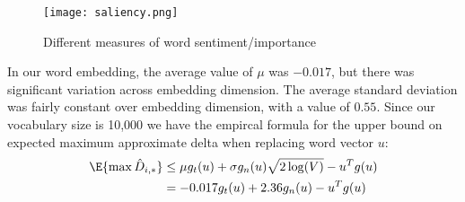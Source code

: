 \begin{figure}
    \centering
    \texttt{[image: saliency.png]}
    \caption{Different measures of word sentiment/importance}
    \label{fig:saliency}
\end{figure}

In our word embedding, the average value of $\mu$ was $-0.017$, but there was significant variation across embedding dimension.  The average standard deviation was fairly constant over embedding dimension, with a value of $0.55$.  Since our vocabulary size is 10,000 we have the empircal formula for the upper bound on expected maximum approximate delta when replacing word vector $u$:
\begin{align}
\E{\max \hat{D}_{i,*}} &\leq \mu g_t(u) + \sigma g_n(u)\sqrt{2\log(V)} -u^Tg(u) \\
&= -0.017g_t(u) + 2.36g_n(u) - u^Tg(u)
\end{align}
